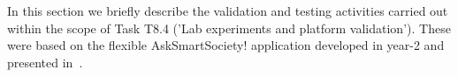 In this section we briefly describe the validation and testing activities carried out within the scope of Task T8.4 ('Lab experiments and platform validation'). These were based on the flexible AskSmartSociety! application developed in year-2 and presented in~\cite{D8.2}.
